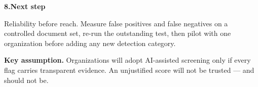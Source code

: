 \documentclass[10pt,a4paper]{article}
\newcommand{\heading}[2]{%
  \par\vspace{5pt}%
  {\color{navy}\bfseries #1\hspace{6pt}#2}%
  \par\vspace{-2pt}%
}
\begin{document}
\heading{8.}{Next step}

Reliability before reach. Measure false positives and false negatives on a
controlled document set, re-run the outstanding test, then pilot with one
organization before adding any new detection category.

\vspace{2pt}
{\footnotesize\color{muted}\textbf{Key assumption.} Organizations will adopt
AI-assisted screening only if every flag carries transparent evidence. An
unjustified score will not be trusted --- and should not be.}
\end{document}

